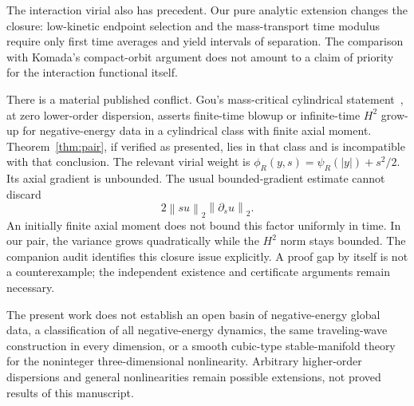 \documentclass[11pt,a4paper]{article}
\theoremstyle{remark}\newtheorem{remark}[theorem]{Remark}
\newcommand{\norm}[1]{\left\|#1\right\|}
\begin{document}
The interaction virial also has precedent. Our pure analytic extension changes the closure: low-kinetic endpoint selection and the mass-transport time modulus require only first time averages and yield intervals of separation. The comparison with Komada's compact-orbit argument does not amount to a claim of priority for the interaction functional itself.

There is a material published conflict. Gou's mass-critical cylindrical statement~\cite[Theorem 1.2]{Gou}, at zero lower-order dispersion, asserts finite-time blowup or infinite-time $H^2$ grow-up for negative-energy data in a cylindrical class with finite axial moment. Theorem~\ref{thm:pair}, if verified as presented, lies in that class and is incompatible with that conclusion. The relevant virial weight is $\phi_R(y,s)=\psi_R(|y|)+s^2/2$. Its axial gradient is unbounded. The usual bounded-gradient estimate cannot discard
\[
 2\norm{su}_2\norm{\partial_su}_2.
\]
An initially finite axial moment does not bound this factor uniformly in time. In our pair, the variance grows quadratically while the $H^2$ norm stays bounded. The companion audit identifies this closure issue explicitly. A proof gap by itself is not a counterexample; the independent existence and certificate arguments remain necessary.

The present work does not establish an open basin of negative-energy global data, a classification of all negative-energy dynamics, the same traveling-wave construction in every dimension, or a smooth cubic-type stable-manifold theory for the noninteger three-dimensional nonlinearity. Arbitrary higher-order dispersions and general nonlinearities remain possible extensions, not proved results of this manuscript.
\end{document}
